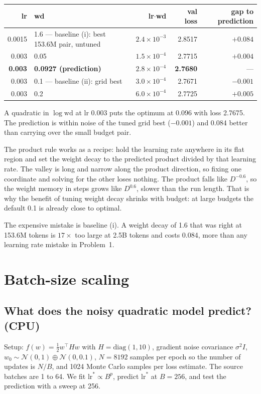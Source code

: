 \documentclass[10pt,letterpaper]{article}
\newcommand{\lrs}{\ensuremath{\mathrm{lr}^{*}}}
\begin{document}
\begin{table}[H]\centering\small
\begin{tabular}{rlrrr}\toprule
lr & wd & lr$\cdot$wd & val loss & gap to prediction\\\midrule
0.0015 & 1.6 --- baseline (i): best 153.6M pair, untuned & $2.4\times10^{-3}$ & 2.8517 & $+0.084$\\
0.003 & 0.05 & $1.5\times10^{-4}$ & 2.7715 & $+0.004$\\
\textbf{0.003} & \textbf{0.0927 (prediction)} & $2.8\times10^{-4}$ & \textbf{2.7680} & ---\\
0.003 & 0.1 --- baseline (ii): grid best & $3.0\times10^{-4}$ & 2.7671 & $-0.001$\\
0.003 & 0.2 & $6.0\times10^{-4}$ & 2.7725 & $+0.005$\\\bottomrule
\end{tabular}
\end{table}

A quadratic in $\log\mathrm{wd}$ at lr 0.003 puts the optimum at 0.096 with loss 2.7675. The prediction is within noise of the tuned grid best ($-0.001$) and 0.084 better than carrying over the small budget pair.

The product rule works as a recipe: hold the learning rate anywhere in its flat region and set the weight decay to the predicted product divided by that learning rate. The valley is long and narrow along the product direction, so fixing one coordinate and solving for the other loses nothing. The product falls like $D^{-0.6}$, so the weight memory in steps grows like $D^{0.6}$, slower than the run length. That is why the benefit of tuning weight decay shrinks with budget: at large budgets the default 0.1 is already close to optimal.

The expensive mistake is baseline (i). A weight decay of 1.6 that was right at 153.6M tokens is $17\times$ too large at 2.5B tokens and costs 0.084, more than any learning rate mistake in Problem~1.

\section{Batch-size scaling}
\subsection{What does the noisy quadratic model predict? (CPU)}

Setup: $f(w)=\tfrac12 w^\top Hw$ with $H=\mathrm{diag}(1,10)$, gradient noise covariance $\sigma^2 I$, $w_0\sim\mathcal N(0,1)\oplus\mathcal N(0,0.1)$, $N=8192$ samples per epoch so the number of updates is $N/B$, and 1024 Monte Carlo samples per loss estimate. The source batches are 1 to 64. We fit $\lrs\propto B^{p}$, predict $\lrs$ at $B=256$, and test the prediction with a sweep at 256.
\end{document}
